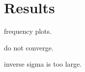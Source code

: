 \chapter{Results} %
\label{cha:results}
frequency plots.

do not converge.

inverse sigma is too large.
